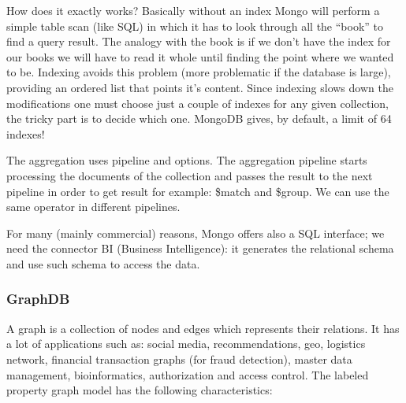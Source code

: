 \documentclass[a4page, 11pt]{article}
\begin{document}
How does it exactly works?
Basically without an index Mongo will perform a simple table scan (like SQL) in which it has to look through all the ``book'' to find a query result. The analogy with the book is if we don't have the index for our books we will have to read it whole until finding the point where we wanted to be. 
Indexing avoids this problem (more problematic if the database is large), providing an ordered list that points it's content.
Since indexing slows down the modifications one must choose just a couple of indexes for any given collection, the tricky part is to decide which one. MongoDB gives, by default, a limit of 64 indexes!

The aggregation uses pipeline and options. 
The aggregation pipeline starts processing the documents of the collection and passes the result to the next pipeline in order to get result for example: \$match and \$group. 
We can use the same operator in different pipelines.

For many (mainly commercial) reasons, Mongo offers also a SQL interface; we need the connector BI (Business Intelligence): it generates the relational schema and use such schema to access the data.

\subsubsection{GraphDB\cite{Neo4J}}

A graph is a collection of nodes and edges which represents their relations. 
It has a lot of applications such as: social media, recommendations, geo, logistics network, financial transaction graphs (for fraud detection), master data management, bioinformatics, authorization and access control.
\newline
The labeled property graph model has the following characteristics:
\end{document}
